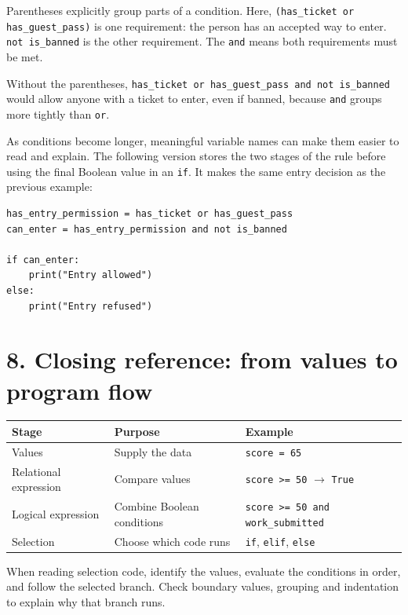 \documentclass[12pt,a4paper]{article}
\begin{document}
Parentheses explicitly group parts of a condition. Here, \texttt{(has\_ticket or has\_guest\_pass)} is one requirement: the person has an accepted way to enter. \texttt{not is\_banned} is the other requirement. The \texttt{and} means both requirements must be met.

Without the parentheses, \texttt{has\_ticket or has\_guest\_pass and not is\_banned} would allow anyone with a ticket to enter, even if banned, because \texttt{and} groups more tightly than \texttt{or}.

As conditions become longer, meaningful variable names can make them easier to read and explain. The following version stores the two stages of the rule before using the final Boolean value in an \texttt{if}. It makes the same entry decision as the previous example:

\begin{minipage}{\linewidth}
\begin{lstlisting}
has_entry_permission = has_ticket or has_guest_pass
can_enter = has_entry_permission and not is_banned

if can_enter:
    print("Entry allowed")
else:
    print("Entry refused")
\end{lstlisting}
\end{minipage}
\par
{}\section*{8. Closing reference: from values to program flow}
\begingroup\small\renewcommand{\arraystretch}{1.3}\begin{longtable}{>{\raggedright\arraybackslash}p{}>{\raggedright\arraybackslash}p{}>{\raggedright\arraybackslash}p{}}
\toprule
\rowcolor{panel} Stage & Purpose & Example \\ \midrule\endhead
Values & Supply the data & \texttt{score = 65} \\
Relational expression & Compare values & \texttt{score >= 50} \ensuremath{\rightarrow} \texttt{True} \\
Logical expression & Combine Boolean conditions & \texttt{score >= 50 and work\_submitted} \\
Selection & Choose which code runs & \texttt{if}, \texttt{elif}, \texttt{else} \\
\bottomrule\end{longtable}\endgroup
When reading selection code, identify the values, evaluate the conditions in order, and follow the selected branch. Check boundary values, grouping and indentation to explain why that branch runs.
\end{document}
